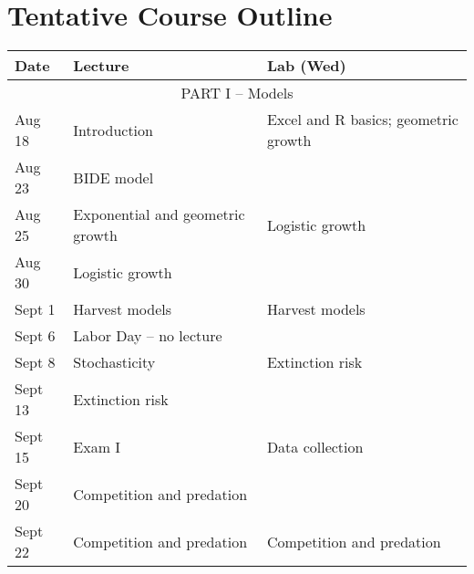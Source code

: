 \documentclass[12pt]{article}
\begin{document}
\clearpage

\section*{\normalsize Tentative Course Outline}

\begin{center}
\begin{tabular}[c]{lll}
\hline \hline
{\bf Date} & {\bf Lecture}                      & {\bf Lab (Wed)}                      \\
\hline
           \multicolumn{3}{c}{PART I -- Models}                                        \\
\hline
\hline
Aug 18     & Introduction                       & Excel and R basics; geometric growth \\
\hline
Aug 23     & BIDE model                         &                                      \\
Aug 25     & Exponential and geometric growth   & Logistic growth                      \\
\hline
Aug 30     & Logistic growth                    &                                      \\
Sept 1     & Harvest models                     & Harvest models                       \\
\hline
Sept 6     & Labor Day -- no lecture            &                                      \\
Sept 8     & Stochasticity                      & Extinction risk                      \\
\hline
Sept 13    & Extinction risk                    &                                      \\
Sept 15    & Exam I                             & Data collection                      \\
\hline
Sept 20    & Competition and predation          &                                      \\
Sept 22    & Competition and predation          & Competition and predation            \\

\end{tabular}
\end{center}
\end{document}
